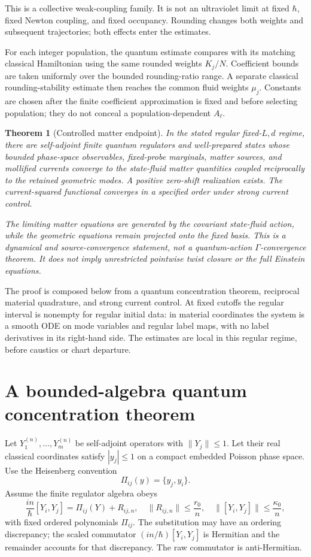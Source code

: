 \documentclass[11pt]{article}
\newtheorem{theorem}{Theorem}[section]
\begin{document}
This is a collective weak-coupling family. It is not an ultraviolet limit at fixed $\hbar$, fixed Newton coupling, and fixed occupancy. Rounding changes both weights and subsequent trajectories; both effects enter the estimates.

For each integer population, the quantum estimate compares with its matching classical Hamiltonian using the same rounded weights $K_j/N$. Coefficient bounds are taken uniformly over the bounded rounding-ratio range. A separate classical rounding-stability estimate then reaches the common fluid weights $\mu_j$. Constants are chosen after the finite coefficient approximation is fixed and before selecting population; they do not conceal a population-dependent $A_\ell$.

\begin{theorem}[Controlled matter endpoint]\label{thm:main}
In the stated regular fixed-$L,d$ regime, there are self-adjoint finite quantum regulators and well-prepared states whose bounded phase-space observables, fixed-probe marginals, matter sources, and mollified currents converge to the state-fluid matter quantities coupled reciprocally to the retained geometric modes. A positive zero-shift realization exists. The current-squared functional converges in a specified order under strong current control.

The limiting matter equations are generated by the covariant state-fluid action, while the geometric equations remain projected onto the fixed basis. This is a dynamical and source-convergence statement, not a quantum-action $\Gamma$-convergence theorem. It does not imply unrestricted pointwise twist closure or the full Einstein equations.
\end{theorem}

The proof is composed below from a quantum concentration theorem, reciprocal material quadrature, and strong current control. At fixed cutoffs the regular interval is nonempty for regular initial data: in material coordinates the system is a smooth ODE on mode variables and regular label maps, with no label derivatives in its right-hand side. The estimates are local in this regular regime, before caustics or chart departure.

\section{A bounded-algebra quantum concentration theorem}
Let $Y_1^{(n)},\ldots,Y_m^{(n)}$ be self-adjoint operators with $\|Y_j\|\le1$. Let their real classical coordinates satisfy $|y_j|\le1$ on a compact embedded Poisson phase space. Use the Heisenberg convention
\[
\Pi_{ij}(y)=\{y_j,y_i\}.
\]
Assume the finite regulator algebra obeys
\begin{equation}\label{eq:basic}
\frac{in}{\hbar}[Y_i,Y_j]=\Pi_{ij}(Y)+R_{ij,n},
\quad \|R_{ij,n}\|\le\frac{r_0}{n},
\quad \|[Y_i,Y_j]\|\le\frac{\kappa_0}{n},
\end{equation}
with fixed ordered polynomials $\Pi_{ij}$. The substitution may have an ordering discrepancy; the scaled commutator $(in/\hbar)[Y_i,Y_j]$ is Hermitian and the remainder accounts for that discrepancy. The raw commutator is anti-Hermitian.
\end{document}
